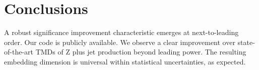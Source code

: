 \section{Conclusions}\label{sec:conclusions}

A robust significance improvement characteristic emerges at
next-to-leading order. Our code is publicly available. We observe a
clear improvement over state-of-the-art TMDs of Z plus jet production
beyond leading power. The resulting embedding dimension is universal
within statistical uncertainties, as expected.

